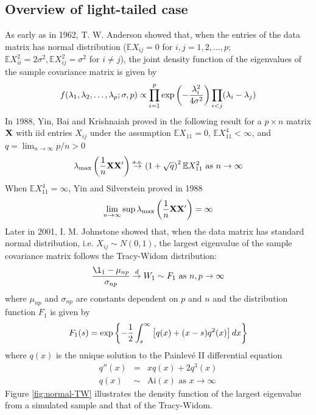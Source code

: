 \documentclass[11pt,reqno]{amsart}
\newcommand{\E}{\mathbb{E}}
\newcommand{\1}{\mathds{1}}
\newcommand{\0}{\boldsymbol{0}}
\newcommand{\M}{\text{max}}
\newcommand{\4}{\mathchoice{\mskip1.5mu}{\mskip1.5mu}{}{}}
\newcommand{\5}{\mathchoice{\mskip-1.5mu}{\mskip-1.5mu}{}{}}
\newcommand{\2}{\penalty250\mskip\thickmuskip\mskip-\thinmuskip} %
\newcommand{\as}{{\rm a.s.}}
\begin{document}
\subsection{Overview of light-tailed
  case}\label{sec:light_tail_review}
As early as in 1962, T. W. Anderson \cite{anderson:1963} showed that,
when the entries of the data matrix has normal distribution ($\E
X_{ij} = 0$ for $i,j = 1,2,\dots, p$; $\E X_{ii}^2 = 2\sigma^2, \E
X_{ij}^2 = \sigma^2$ for $i \neq j$), the joint density function
of the eigenvalues of the sample covariance matrix is given by
\[
f(\lambda_1, \lambda_2, \dots, \lambda_p; \sigma, p) \propto \prod_{i=1}^p \exp\left(
  -{\lambda_i^2 \over 4\sigma^2}
\right) \prod_{i < j} (\lambda_i - \lambda_j)
\]
In 1988, Yin, Bai and Krishnaiah proved in
\cite{yin:bai:Krishnaiah:1988} the following result for a $p \times n$
matrix $\bf X$ with iid entries $X_{ij}$ under the assumption $\E
X_{11} = 0$, $\E X_{11}^4 < \infty$, and $q = \lim_{n \to \infty} p/n
> 0$
\[
\lambda_{\M}\left({1 \over n}\bf{XX'}\right) \overset{\as}{\to} \left(
  1 + \sqrt{q}
\right)^2 \E X_{11}^2 \text{ as }n \to \infty
\]
When $\E X_{11}^4 = \infty$, Yin and Silverstein proved in 1988
\cite{yin:silverstein:1988}
\[
\lim_{n \to \infty} \sup \lambda_{\M}\left({1 \over
    n}\bf{XX'}\right) = \infty
\]
Later in 2001, I. M. Johnstone showed that, when the data matrix has
standard normal distribution, i.e. $X_{ij} \sim N(0, 1)$, the largest
eigenvalue of the sample covariance matrix follows the Tracy-Widom
distribution:
\[
{ł_1 - \mu_{np} \over \sigma_{np}} \overset{d}{\to} W_1 \sim F_1
\text{ as }{n, p \to \infty}
\]
where $\mu_{np}$ and $\sigma_{np}$ are constants dependent on $p$ and
$n$ and the distribution function $F_1$ is given by
\[
F_1(s) = \exp\left\{
  -{1 \over 2} \int_{s}^\infty \left[
    q(x) + (x - s) q^2(x)
  \right] dx
\right\}
\]
where $q(x)$ is the unique solution to the Painlev\'e II differential
equation
\begin{eqnarray*}
  q''(x) &=& xq(x) + 2 q^3(x) \\
  q(x) &\sim& \text{Ai}(x) \text{ as } x \to \infty
\end{eqnarray*}
Figure \ref{fig:normal-TW} illustrates the density function of the largest
eigenvalue from a simulated sample and that of the Tracy-Widom.
\end{document}
